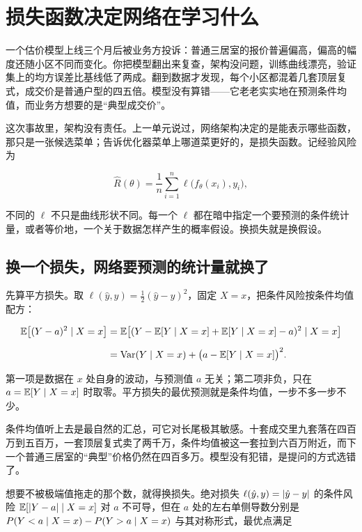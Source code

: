 \section{损失函数决定网络在学习什么}
\label{sec:14-Deep-Learning/02-Losses-and-Backpropagation/01}

一个估价模型上线三个月后被业务方投诉：普通三居室的报价普遍偏高，偏高的幅度还随小区不同而变化。你把模型翻出来复查，架构没问题，训练曲线漂亮，验证集上的均方误差比基线低了两成。翻到数据才发现，每个小区都混着几套顶层复式，成交价是普通户型的四五倍。模型没有算错——它老老实实地在预测条件均值，而业务方想要的是``典型成交价''。

这次事故里，架构没有责任。上一单元说过，网络架构决定的是能表示哪些函数，那只是一张候选菜单；告诉优化器菜单上哪道菜更好的，是损失函数。记经验风险为

\[
\widehat R(\theta)
=\frac1n\sum_{i=1}^n
\ell\bigl(f_\theta(x_i),y_i\bigr),
\]

不同的 \(\ell\) 不只是曲线形状不同。每一个 \(\ell\) 都在暗中指定一个要预测的条件统计量，或者等价地，一个关于数据怎样产生的概率假设。换损失就是换假设。

\subsection{换一个损失，网络要预测的统计量就换了}

先算平方损失。取 \(\ell(\hat y,y)=\frac12(\hat y-y)^2\)，固定 \(X=x\)，把条件风险按条件均值配方：

\[
\begin{aligned}
\mathbb{E}\bigl[(Y-a)^2\mid X=x\bigr]
&=\mathbb{E}\bigl[(Y-\mathbb{E}[Y\mid X=x]+\mathbb{E}[Y\mid X=x]-a)^2\mid X=x\bigr]\\[2mm]
&=\operatorname{Var}(Y\mid X=x)
+\bigl(a-\mathbb{E}[Y\mid X=x]\bigr)^2 .
\end{aligned}
\]

第一项是数据在 \(x\) 处自身的波动，与预测值 \(a\) 无关；第二项非负，只在 \(a=\mathbb{E}[Y\mid X=x]\) 时取零。平方损失的最优预测就是条件均值，一步不多一步不少。

条件均值听上去是最自然的汇总，可它对长尾极其敏感。十套成交里九套落在四百万到五百万，一套顶层复式卖了两千万，条件均值被这一套拉到六百万附近，而下一个普通三居室的``典型''价格仍然在四百多万。模型没有犯错，是提问的方式选错了。

想要不被极端值拖走的那个数，就得换损失。绝对损失 \(\ell(\hat y,y)=\left|\hat y-y\right|\) 的条件风险 \(\mathbb{E}[\left|Y-a\right|\mid X=x]\) 对 \(a\) 不可导，但在 \(a\) 处的左右单侧导数分别是 \(P(Y<a\mid X=x)-P(Y>a\mid X=x)\) 与其对称形式，最优点满足


